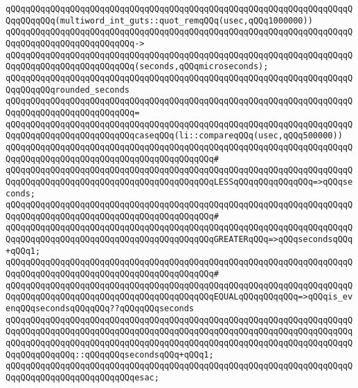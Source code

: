 \verb|qQQqqQQqqQQqqQQqqQQqqQQqqQQqqQQqqQQqqQQqqQQqqQQqqQQqqQQqqQQqqQQqqQQqqQQqqQQqqQQq(multiword_int_guts::quot_remqQQq(usec,qQQq1000000))|\newline
\verb|qQQqqQQqqQQqqQQqqQQqqQQqqQQqqQQqqQQqqQQqqQQqqQQqqQQqqQQqqQQqqQQqqQQqqQQqqQQqqQQqqQQqqQQqqQQqqQQq->|\newline
\verb|qQQqqQQqqQQqqQQqqQQqqQQqqQQqqQQqqQQqqQQqqQQqqQQqqQQqqQQqqQQqqQQqqQQqqQQqqQQqqQQqqQQqqQQqqQQqqQQq(seconds,qQQqmicroseconds);|\newline
\newline
\verb|qQQqqQQqqQQqqQQqqQQqqQQqqQQqqQQqqQQqqQQqqQQqqQQqqQQqqQQqqQQqqQQqqQQqqQQqqQQqqQQqrounded_seconds|\newline
\verb|qQQqqQQqqQQqqQQqqQQqqQQqqQQqqQQqqQQqqQQqqQQqqQQqqQQqqQQqqQQqqQQqqQQqqQQqqQQqqQQqqQQqqQQqqQQqqQQq=|\newline
\verb|qQQqqQQqqQQqqQQqqQQqqQQqqQQqqQQqqQQqqQQqqQQqqQQqqQQqqQQqqQQqqQQqqQQqqQQqqQQqqQQqqQQqqQQqqQQqqQQqcaseqQQq(li::compareqQQq(usec,qQQq500000))|\newline
\verb|qQQqqQQqqQQqqQQqqQQqqQQqqQQqqQQqqQQqqQQqqQQqqQQqqQQqqQQqqQQqqQQqqQQqqQQqqQQqqQQqqQQqqQQqqQQqqQQqqQQqqQQqqQQqqQQq#|\newline
\verb|qQQqqQQqqQQqqQQqqQQqqQQqqQQqqQQqqQQqqQQqqQQqqQQqqQQqqQQqqQQqqQQqqQQqqQQqqQQqqQQqqQQqqQQqqQQqqQQqqQQqqQQqqQQqqQQqLESSqQQqqQQqqQQqqQQq=>qQQqseconds;|\newline
\verb|qQQqqQQqqQQqqQQqqQQqqQQqqQQqqQQqqQQqqQQqqQQqqQQqqQQqqQQqqQQqqQQqqQQqqQQqqQQqqQQqqQQqqQQqqQQqqQQqqQQqqQQqqQQqqQQq#|\newline
\verb|qQQqqQQqqQQqqQQqqQQqqQQqqQQqqQQqqQQqqQQqqQQqqQQqqQQqqQQqqQQqqQQqqQQqqQQqqQQqqQQqqQQqqQQqqQQqqQQqqQQqqQQqqQQqqQQqGREATERqQQq=>qQQqsecondsqQQq+qQQq1;|\newline
\verb|qQQqqQQqqQQqqQQqqQQqqQQqqQQqqQQqqQQqqQQqqQQqqQQqqQQqqQQqqQQqqQQqqQQqqQQqqQQqqQQqqQQqqQQqqQQqqQQqqQQqqQQqqQQqqQQq#|\newline
\verb|qQQqqQQqqQQqqQQqqQQqqQQqqQQqqQQqqQQqqQQqqQQqqQQqqQQqqQQqqQQqqQQqqQQqqQQqqQQqqQQqqQQqqQQqqQQqqQQqqQQqqQQqqQQqqQQqEQUALqQQqqQQqqQQq=>qQQqis_evenqQQqsecondsqQQqqQQq??qQQqqQQqseconds|\newline
\verb|qQQqqQQqqQQqqQQqqQQqqQQqqQQqqQQqqQQqqQQqqQQqqQQqqQQqqQQqqQQqqQQqqQQqqQQqqQQqqQQqqQQqqQQqqQQqqQQqqQQqqQQqqQQqqQQqqQQqqQQqqQQqqQQqqQQqqQQqqQQqqQQqqQQqqQQqqQQqqQQqqQQqqQQqqQQqqQQqqQQqqQQqqQQqqQQqqQQqqQQqqQQqqQQqqQQqqQQqqQQqqQQq::qQQqqQQqsecondsqQQq+qQQq1;|\newline
\verb|qQQqqQQqqQQqqQQqqQQqqQQqqQQqqQQqqQQqqQQqqQQqqQQqqQQqqQQqqQQqqQQqqQQqqQQqqQQqqQQqqQQqqQQqqQQqqQQqesac;|\newline

